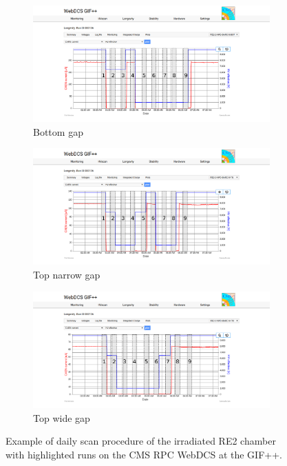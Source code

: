 	\begin{figure}[H]
    	\begin{subfigure}{\linewidth}
			\centering
    		\includegraphics[width = .9\linewidth]{fig/chapt5/Daily-rate-scan-BOT.png}
        	\caption{\label{fig:Daily-Scan-Proc:A} Bottom gap}
    	\end{subfigure}
    	\begin{subfigure}{\linewidth}
			\centering
    		\includegraphics[width = .9\linewidth]{fig/chapt5/Daily-rate-scan-TN.png}
        	\caption{\label{fig:Daily-Scan-Proc:B} Top narrow gap}
    	\end{subfigure}
    	\begin{subfigure}{\linewidth}
			\centering
    		\includegraphics[width = .9\linewidth]{fig/chapt5/Daily-rate-scan-TW.png}
        	\caption{\label{fig:Daily-Scan-Proc:C} Top wide gap}
    	\end{subfigure}
		\caption{\label{fig:Daily-Scan-Proc} Example of daily scan procedure of the irradiated RE2 chamber with highlighted runs on the CMS RPC WebDCS at the GIF++.}
	\end{figure}
	
